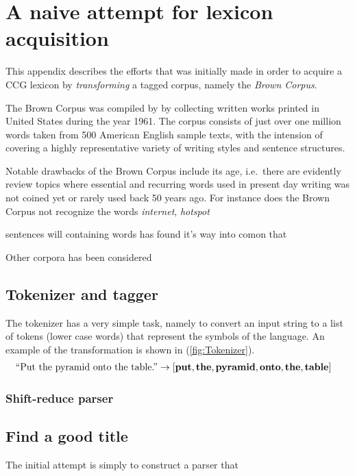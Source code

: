 \chapter{A naive attempt for lexicon acquisition}
\label{chap:brownCorpus}

This appendix describes the efforts that was initially made in order to acquire a CCG lexicon by \emph{transforming} a tagged corpus, namely the \emph{Brown Corpus}.

The Brown Corpus was compiled by \citeauthor{brown}  by collecting written works printed in United States during the year 1961. The corpus consists of just over one million words taken from 500 American English sample texts, with the intension of covering a highly representative variety of writing styles and sentence structures.

Notable drawbacks of the Brown Corpus include its age, i.e.\ there are evidently review topics where essential and recurring words used in present day writing was not coined yet or rarely used back 50 years ago. For instance does the Brown Corpus not recognize the words \emph{internet}, \emph{hotspot}

   sentences will containing words has found it's way into comon  that 

Other corpora has been considered

\section{Tokenizer and tagger}
The tokenizer has a very simple task, namely to convert an input string to a list of tokens (lower case words) that represent the symbols of the language. An example of the transformation is shown in
(\ref{fig:Tokenizer}).
\begin{align}
  &\text{``Put the pyramid onto the table.''} \to 
  \left[ 
  \mathbf{put}, \mathbf{the}, \mathbf{pyramid}, \mathbf{onto}, \mathbf{the}, \mathbf{table} 
  \right] 
  \label{fig:Tokenizer}
\end{align}

\subsection{Shift-reduce parser}
\section{Find a good title}
The initial attempt is simply to construct a parser that 

